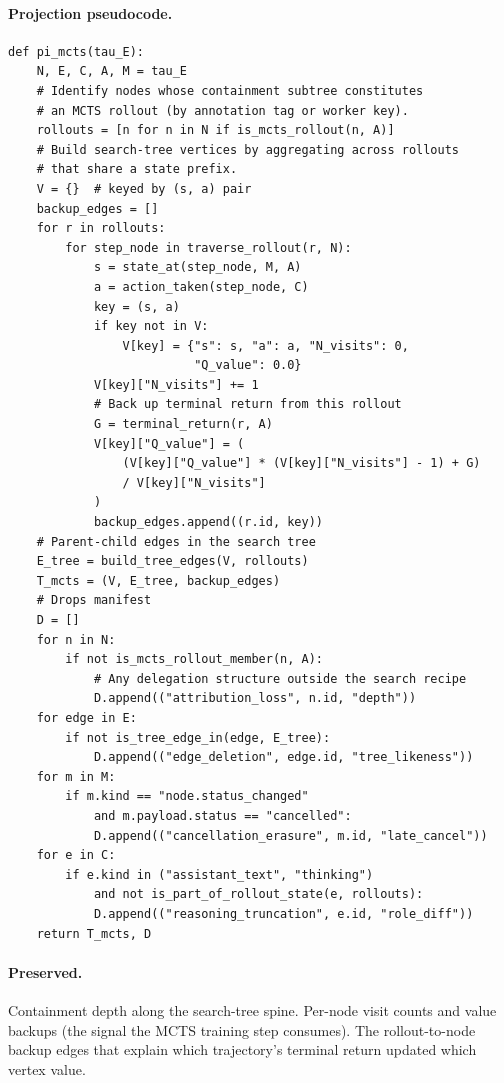 \documentclass{article}
\begin{document}
\paragraph{Projection pseudocode.}
\begin{lstlisting}
def pi_mcts(tau_E):
    N, E, C, A, M = tau_E
    # Identify nodes whose containment subtree constitutes
    # an MCTS rollout (by annotation tag or worker key).
    rollouts = [n for n in N if is_mcts_rollout(n, A)]
    # Build search-tree vertices by aggregating across rollouts
    # that share a state prefix.
    V = {}  # keyed by (s, a) pair
    backup_edges = []
    for r in rollouts:
        for step_node in traverse_rollout(r, N):
            s = state_at(step_node, M, A)
            a = action_taken(step_node, C)
            key = (s, a)
            if key not in V:
                V[key] = {"s": s, "a": a, "N_visits": 0,
                          "Q_value": 0.0}
            V[key]["N_visits"] += 1
            # Back up terminal return from this rollout
            G = terminal_return(r, A)
            V[key]["Q_value"] = (
                (V[key]["Q_value"] * (V[key]["N_visits"] - 1) + G)
                / V[key]["N_visits"]
            )
            backup_edges.append((r.id, key))
    # Parent-child edges in the search tree
    E_tree = build_tree_edges(V, rollouts)
    T_mcts = (V, E_tree, backup_edges)
    # Drops manifest
    D = []
    for n in N:
        if not is_mcts_rollout_member(n, A):
            # Any delegation structure outside the search recipe
            D.append(("attribution_loss", n.id, "depth"))
    for edge in E:
        if not is_tree_edge_in(edge, E_tree):
            D.append(("edge_deletion", edge.id, "tree_likeness"))
    for m in M:
        if m.kind == "node.status_changed"
            and m.payload.status == "cancelled":
            D.append(("cancellation_erasure", m.id, "late_cancel"))
    for e in C:
        if e.kind in ("assistant_text", "thinking")
            and not is_part_of_rollout_state(e, rollouts):
            D.append(("reasoning_truncation", e.id, "role_diff"))
    return T_mcts, D
\end{lstlisting}

\paragraph{Preserved.} Containment depth along the search-tree
spine. Per-node visit counts and value backups (the signal the
MCTS training step consumes). The rollout-to-node backup edges
that explain which trajectory's terminal return updated which
vertex value.
\end{document}
